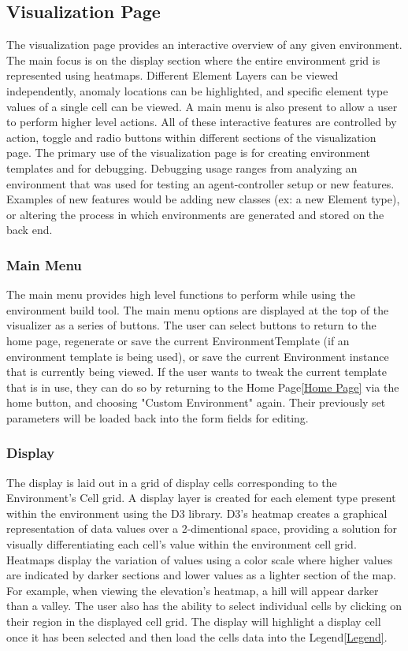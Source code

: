 \subsection{Visualization Page}
The visualization page provides an interactive overview of any given environment.
The main focus is on the display section where the entire environment grid is represented using heatmaps.
Different Element Layers can be viewed independently, anomaly locations can be highlighted, and specific element type values of a single cell can be viewed.
A main menu is also present to allow a user to perform higher level actions.
All of these interactive features are controlled by action, toggle and radio buttons within different sections of the visualization page.
The primary use of the visualization page is for creating environment templates and for debugging.
Debugging usage ranges from analyzing an environment that was used for testing an agent-controller setup or new features.
Examples of new features would be adding new classes (ex: a new Element type), or altering the process in which environments are generated and stored on the back end.


\subsubsection{Main Menu}
The main menu provides high level functions to perform while using the environment build tool.
The main menu options are displayed at the top of the visualizer as a series of buttons.
The user can select buttons to return to the home page, regenerate or save the current EnvironmentTemplate (if an environment template is being used), or save the current Environment instance that is currently being viewed.
If the user wants to tweak the current template that is in use, they can do so by returning to the Home Page\ref{Home Page} via the home button, and choosing "Custom Environment" again.
Their previously set parameters will be loaded back into the form fields for editing.


\subsubsection{Display}
The display is laid out in a grid of display cells corresponding to the Environment's Cell grid.
A display layer is created for each element type present within the environment using the D3 library.
D3's heatmap creates a graphical representation of data values over a 2-dimentional space, providing a solution for visually differentiating each cell's value within the environment cell grid.
Heatmaps display the variation of values using a color scale where higher values are indicated by darker sections and lower values as a lighter section of the map.
For example, when viewing the elevation's heatmap, a hill will appear darker than a valley.
The user also has the ability to select individual cells by clicking on their region in the displayed cell grid.
The display will highlight a display cell once it has been selected and then load the cells data into the Legend\ref{Legend}.


